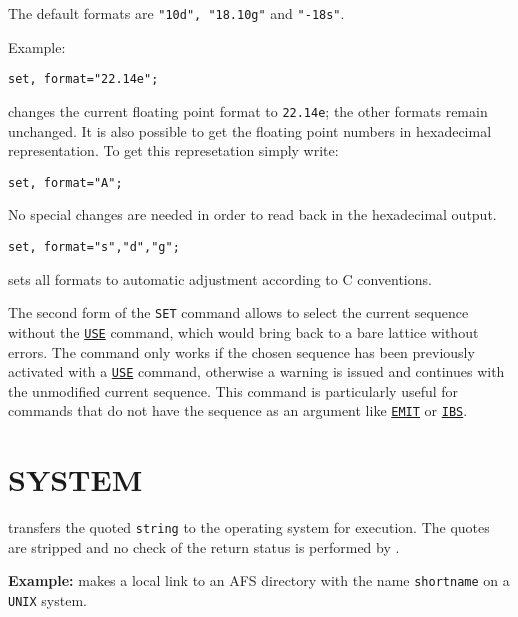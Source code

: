 

The default formats are \texttt{"10d", "18.10g"} and \texttt{"-18s"}.

Example: 
\begin{verbatim}
set, format="22.14e";
\end{verbatim} 
changes the current floating point format to \texttt{22.14e}; the other
formats remain unchanged. It is also possible to get the floating point numbers
in hexadecimal representation. To get this represetation simply write:
\begin{verbatim}
set, format="A";
\end{verbatim}
No special changes are needed in order to read back in the hexadecimal output.
\begin{verbatim}
set, format="s","d","g";
\end{verbatim} 
sets all formats to automatic adjustment according to C conventions. 

The second form of the \texttt{SET} command allows to select the
current sequence without the \hyperref[sec:use]{\texttt{USE}} command,
which would bring back to a bare lattice without errors. The command
only works 
if the chosen sequence has been previously activated with a
\hyperref[sec:use]{\texttt{USE}} 
command, otherwise a warning is issued and \madx continues with the
unmodified current sequence. This command is particularly useful for
commands that do not have the sequence as an argument like
\hyperref[chap:emit]{\texttt{EMIT}} or \hyperref[chap:ibs]{\texttt{IBS}}. 



\section{SYSTEM}
\label{sec:system}
transfers the quoted \texttt{string} to the operating system for
execution. The quotes are stripped and no check of the return status is
performed by \madx. 

\textbf{Example:} 
makes a local link to an AFS directory with the name \texttt{shortname}
on a \texttt{UNIX} system.  

